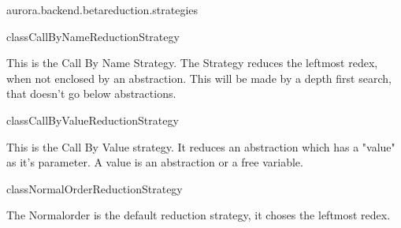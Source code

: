 \begin{texdocpackage}{aurora.backend.betareduction.strategies}
\label{texdoclet:aurora.backend.betareduction.strategies}

\begin{texdocclass}{class}{CallByName}{ReductionStrategy}{}
\label{texdoclet:aurora.backend.betareduction.strategies.CallByName}
\begin{texdocclassintro}
This is the Call By Name Strategy. The Strategy reduces the leftmost redex, when not enclosed by an abstraction.
 This will be made by a depth first search, that doesn't go below abstractions.\end{texdocclassintro}
\begin{texdocclassconstructors}
\end{texdocclassconstructors}
\begin{texdocclassmethods}
\end{texdocclassmethods}
\end{texdocclass}


\begin{texdocclass}{class}{CallByValue}{ReductionStrategy}{}
\label{texdoclet:aurora.backend.betareduction.strategies.CallByValue}
\begin{texdocclassintro}
This is the Call By Value strategy. It reduces an abstraction which has a "value" as it's parameter. A value is an abstraction or a free variable.\end{texdocclassintro}
\begin{texdocclassconstructors}
\end{texdocclassconstructors}
\begin{texdocclassmethods}
\end{texdocclassmethods}
\end{texdocclass}


\begin{texdocclass}{class}{NormalOrder}{ReductionStrategy}{}
\label{texdoclet:aurora.backend.betareduction.strategies.NormalOrder}
\begin{texdocclassintro}
The Normalorder is the default reduction strategy, it choses the leftmost redex.\end{texdocclassintro}
\begin{texdocclassconstructors}
\end{texdocclassconstructors}
\begin{texdocclassmethods}
\end{texdocclassmethods}
\end{texdocclass}



\end{texdocpackage}
